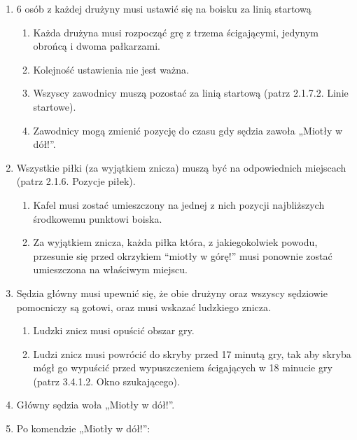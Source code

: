 \documentclass[12pt]{article}
\begin{document}
\begin{enumerate}
	\item
	      6 osób z każdej drużyny musi ustawić się na boisku za linią startową

	      \begin{enumerate}
		      \item
		            Każda drużyna musi rozpocząć grę z trzema ścigającymi, jedynym
		            obrońcą i dwoma pałkarzami.
		      \item
		            Kolejność ustawienia nie jest ważna.
		      \item
		            Wszyscy zawodnicy muszą pozostać za linią startową (patrz 2.1.7.2.
		            Linie startowe).
		      \item
		            Zawodnicy mogą zmienić pozycję do czasu gdy sędzia zawoła „Miotły w
		            dół!''.
	      \end{enumerate}
	\item
	      Wszystkie piłki (za wyjątkiem znicza) muszą być na odpowiednich
	      miejscach (patrz 2.1.6. Pozycje piłek).

	      \begin{enumerate}
		      \item
		            Kafel musi zostać umieszczony na jednej z nich pozycji najbliższych
		            środkowemu punktowi boiska.
		      \item
		            Za wyjątkiem znicza, każda piłka która, z jakiegokolwiek powodu,
		            przesunie się przed okrzykiem ``miotły w górę!'' musi ponownie
		            zostać umieszczona na właściwym miejscu.
	      \end{enumerate}
	\item
	      Sędzia główny musi upewnić się, że obie drużyny oraz wszyscy sędziowie
	      pomocniczy są gotowi, oraz musi wskazać ludzkiego znicza.

	      \begin{enumerate}
		      \item
		            Ludzki znicz musi opuścić obszar gry.
		      \item
		            Ludzi znicz musi powrócić do skryby przed 17 minutą gry, tak aby
		            skryba mógł go wypuścić przed wypuszczeniem ścigających w 18 minucie
		            gry (patrz 3.4.1.2. Okno szukającego).
	      \end{enumerate}
	\item
	      Główny sędzia woła „Miotły w dół!''.
	\item
	      Po komendzie „Miotły w dół!'':


\end{enumerate}
\end{document}
